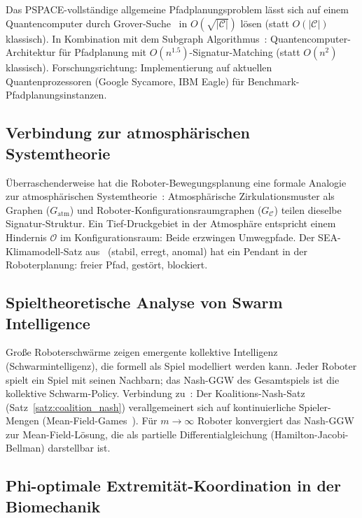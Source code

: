 ﻿\documentclass[a4paper,12pt]{article}
\theoremstyle{definition}
\newcommand{\Cspace}{\mathcal{C}}
\begin{document}
Das PSPACE-vollst\"andige allgemeine Pfadplanungsproblem l\"asst sich auf
einem Quantencomputer durch Grover-Suche~\cite{grover1996} in
$O(\sqrt{|\Cspace|})$ l\"osen (statt $O(|\Cspace|)$ klassisch).
In Kombination mit dem Subgraph Algorithmus~\cite{epp2026qsubgraph}:
Quantencomputer-Architektur f\"ur Pfadplanung mit
$O(n^{1.5})$-Signatur-Matching (statt $O(n^2)$ klassisch).
Forschungsrichtung: Implementierung auf aktuellen Quantenprozessoren
(Google Sycamore, IBM Eagle) f\"ur Benchmark-Pfadplanungsinstanzen.

\subsection{Verbindung zur atmosphärischen Systemtheorie}

\"Uberraschenderweise hat die Roboter-Bewegungsplanung eine formale Analogie
zur atmosph\"arischen Systemtheorie~\cite{epp2026klima}:
Atmosph\"arische Zirkulationsmuster als Graphen ($G_{\mathrm{atm}}$) und
Roboter-Konfigurationsraumgraphen ($G_{\Cspace}$) teilen dieselbe
Signatur-Struktur.
Ein Tief-Druckgebiet in der Atmosph\"are entspricht einem Hindernis $\mathcal{O}$
im Konfigurationsraum: Beide erzwingen Umwegpfade.
Der SEA-Klimamodell-Satz aus~\cite{epp2026klima} (stabil, erregt, anomal)
hat ein Pendant in der Roboterplanung: freier Pfad, gest\"ort, blockiert.

\subsection{Spieltheoretische Analyse von Swarm Intelligence}

Gro{\ss}e Roboterschwärme zeigen emergente kollektive Intelligenz
(Schwarmintelligenz), die formell als Spiel modelliert werden kann.
Jeder Roboter spielt ein Spiel mit seinen Nachbarn; das Nash-GGW des
Gesamtspiels ist die kollektive Schwarm-Policy.
Verbindung zu~\cite{epp2026spieltheorie}: Der Koalitions-Nash-Satz
(Satz~\ref{satz:coalition_nash}) verallgemeinert sich auf kontinuierliche
Spieler-Mengen (Mean-Field-Games~\cite{lasry2007}).
F\"ur $m \to \infty$ Roboter konvergiert das Nash-GGW zur Mean-Field-L\"osung,
die als partielle Differentialgleichung (Hamilton-Jacobi-Bellman)
darstellbar ist.

\subsection{Phi-optimale Extremität-Koordination in der Biomechanik}
\end{document}
